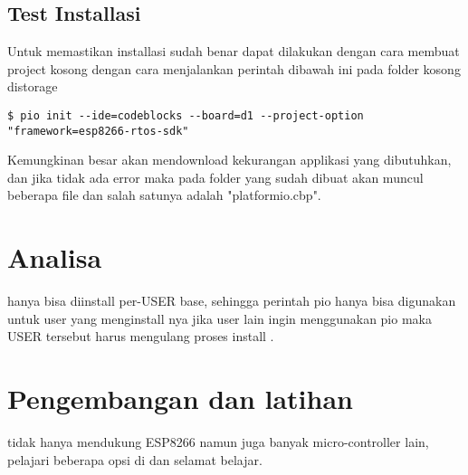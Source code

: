 \subsection{Test Installasi}
Untuk memastikan installasi \pio{} sudah benar dapat dilakukan dengan cara membuat project kosong  dengan cara menjalankan perintah dibawah ini pada folder kosong distorage
\begin{lstlisting}[style=bash]
$ pio init --ide=codeblocks --board=d1 --project-option "framework=esp8266-rtos-sdk"
\end{lstlisting}
Kemungkinan besar \pio{} akan mendownload kekurangan applikasi yang dibutuhkan, dan jika tidak ada error maka pada folder yang sudah dibuat akan muncul beberapa file dan salah satunya adalah "platformio.cbp".

\section{Analisa}
\pio{} hanya bisa diinstall per-USER base, sehingga perintah pio hanya bisa digunakan untuk user yang menginstall nya jika user lain ingin menggunakan pio maka USER tersebut harus mengulang proses install \pio.

\section{Pengembangan dan latihan}
\pio{} tidak hanya mendukung ESP8266 namun juga banyak micro-controller lain, pelajari beberapa opsi di \pio{} dan selamat belajar.


